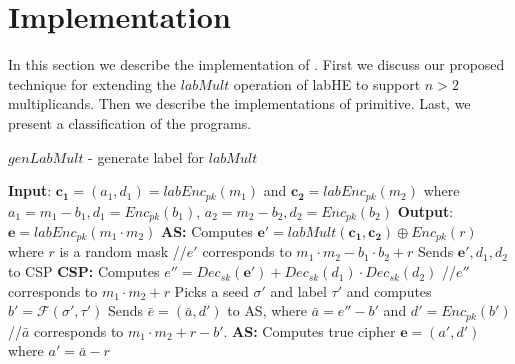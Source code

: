 \section{Implementation}\label{sec:implementation}
\label{implementation}
In this section we describe the implementation of \system. First we discuss our proposed technique for extending the $labMult$ operation of \textsf{labHE} to support $n > 2$ multiplicands. Then we describe the implementations of \system primitive. Last, we present a  classification of the \system programs. 
\begin{algorithm}[b]
\caption{$genLabMult$ - generate label for $labMult$}\label{algo:genlabmult}
\small
\begin{algorithmic}[1]
\STATEx
\textbf{Input}: $\mathbf{c_1}=(a_1,d_1)=labEnc_{pk}(m_1)$ and $\mathbf{c_2}=labEnc_{pk}(m_2)$ 
\STATEx where $a_1= m_1-b_1, d_1=Enc_{pk}(b_1)$, $a_2= m_2-b_2, d_2=Enc_{pk}(b_2)$
\STATEx \textbf{Output}: $\mathbf{e}=labEnc_{pk}(m_1\cdot m_2)$
\STATEx \textbf{\textsf{AS}:} 
\STATE Computes $\textbf{e}'=labMult(\mathbf{c_1,c_2}) \oplus Enc_{pk}(r)$ where $r$ is a random mask 
\STATEx  //$e'$ corresponds to $m_1\cdot m_2-b_1\cdot b_2+r$
\STATE Sends $\mathbf{e'},d_1,d_2$ to \textsf{CSP}
\STATEx \textbf{\textsf{CSP}:}
\STATE Computes $e''= Dec_{sk}(\mathbf{e'}) + Dec_{sk}(d_1)\cdot Dec_{sk}(d_2)$
\STATEx //$e''$ corresponds to $m_1\cdot m_2 + r$ 
\STATE Picks a seed $\sigma'$ and label $\tau'$ and computes $b'=\mathcal{F}(\sigma',\tau')$ 
\STATE Sends $\bar{e}=(\bar{a},d')$ to \textsf{AS}, where $\bar{a} = e''-b'$ and $d' = Enc_{pk}(b')$
\STATEx //$\bar{a}$ corresponds to $m_1\cdot m_2 + r-b'$.
\STATEx \textbf{\textsf{AS}:}
\STATE Computes true cipher $\mathbf{e}=(a',d')$ where $a'=\bar{a}-r$ %
 \end{algorithmic}
\end{algorithm}


